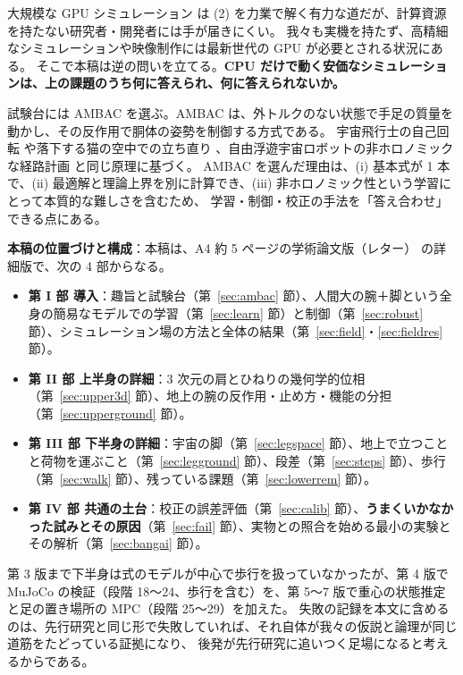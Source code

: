 \documentclass[paper=a4paper,fontsize=10pt,twocolumn,column_gap=2zw,line_length=24zw,number_of_lines=46,head_space=20mm]{jlreq}
\begin{document}
大規模な GPU シミュレーション \cite{makoviychuk2021} は (2) を力業で解く有力な道だが、計算資源を持たない研究者・開発者には手が届きにくい。
我々も実機を持たず、高精細なシミュレーションや映像制作には最新世代の GPU が必要とされる状況にある。
そこで本稿は逆の問いを立てる。\textbf{CPU だけで動く安価なシミュレーションは、上の課題のうち何に答えられ、何に答えられないか。}

試験台には AMBAC を選ぶ。AMBAC は、外トルクのない状態で手足の質量を動かし、その反作用で胴体の姿勢を制御する方式である。
宇宙飛行士の自己回転 \cite{kane1970} や落下する猫の空中での立ち直り \cite{kane1969,montgomery1993}、自由浮遊宇宙ロボットの非ホロノミックな経路計画 \cite{nakamura1991} と同じ原理に基づく。
AMBAC を選んだ理由は、(i) 基本式が 1 本で、(ii) 最適解と理論上界を別に計算でき、(iii) 非ホロノミック性という学習にとって本質的な難しさを含むため、
学習・制御・校正の手法を「答え合わせ」できる点にある。

\textbf{本稿の位置づけと構成}：本稿は、A4 約 5 ページの学術論文版（レター）\cite{letter2026} の詳細版で、次の 4 部からなる。
\begin{itemize}\setlength{\itemsep}{0pt}
\item \textbf{第 I 部 導入}：趣旨と試験台（第~\ref{sec:ambac} 節）、人間大の腕＋脚という全身の簡易なモデルでの学習（第~\ref{sec:learn} 節）と制御（第~\ref{sec:robust} 節）、シミュレーション場の方法と全体の結果（第~\ref{sec:field}・\ref{sec:fieldres} 節）。
\item \textbf{第 II 部 上半身の詳細}：3 次元の肩とひねりの幾何学的位相（第~\ref{sec:upper3d} 節）、地上の腕の反作用・止め方・機能の分担（第~\ref{sec:upperground} 節）。
\item \textbf{第 III 部 下半身の詳細}：宇宙の脚（第~\ref{sec:legspace} 節）、地上で立つことと荷物を運ぶこと（第~\ref{sec:legground} 節）、段差（第~\ref{sec:steps} 節）、歩行（第~\ref{sec:walk} 節）、残っている課題（第~\ref{sec:lowerrem} 節）。
\item \textbf{第 IV 部 共通の土台}：校正の誤差評価（第~\ref{sec:calib} 節）、\textbf{うまくいかなかった試みとその原因}（第~\ref{sec:fail} 節）、実物との照合を始める最小の実験とその解析（第~\ref{sec:bangai} 節）。
\end{itemize}
第 3 版まで下半身は式のモデルが中心で歩行を扱っていなかったが、第 4 版で MuJoCo の検証（段階 18〜24、歩行を含む）を、第 5〜7 版で重心の状態推定と足の置き場所の MPC（段階 25〜29）を加えた。
失敗の記録を本文に含めるのは、先行研究と同じ形で失敗していれば、それ自体が我々の仮説と論理が同じ道筋をたどっている証拠になり、
後発が先行研究に追いつく足場になると考えるからである。
\end{document}

